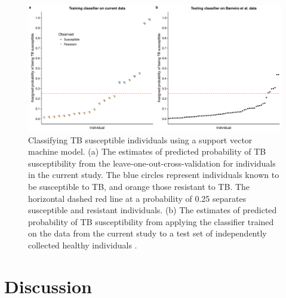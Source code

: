 \documentclass[fleqn,10pt]{wlscirep}
\begin{document}
\begin{figure}[ht]
\centering
\includegraphics[width=\linewidth]{../figure/classifier-svm.pdf}
\caption{
Classifying TB susceptible individuals using a support vector machine
model. (a) The estimates of predicted probability of TB susceptibility
from the leave-one-out-cross-validation for individuals in the current
study. The blue circles represent individuals known to be susceptible
to TB, and orange those resistant to TB. The horizontal dashed red
line at a probability of 0.25 separates susceptible and resistant
individuals. (b) The estimates of predicted probability of TB
susceptibility from applying the classifier trained on the data from
the current study to a test set of independently collected healthy
individuals \cite{Barreiro2012}.
}
\label{fig:classifier}
\end{figure}

\section*{Discussion}
\end{document}
